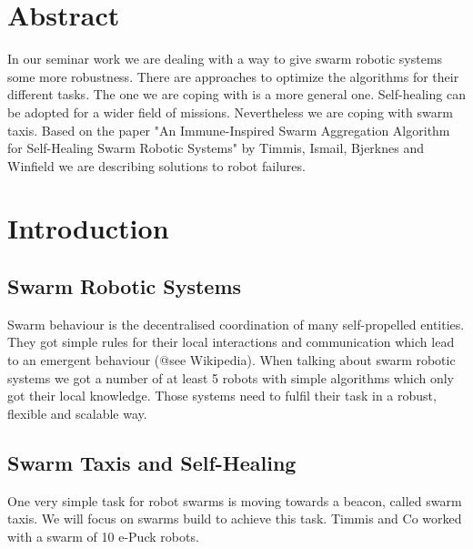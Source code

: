 \documentclass[
	a4paper,
	article,
	pagesize,
	pdftex,
	12pt,
	english,
	fleqn,
	final,
	]{scrartcl}
\begin{document}

\makeTitel

\tableofcontents
\clearpage

\section{Abstract}
In our seminar work we are dealing with a way to give swarm robotic systems some more robustness. There are approaches to optimize the algorithms for their different tasks. The one we are coping with is a more general one. Self-healing can be adopted for a wider field of missions. Nevertheless we are coping with swarm taxis. Based on the paper "An Immune-Inspired Swarm Aggregation Algorithm for Self-Healing Swarm Robotic Systems" by Timmis, Ismail, Bjerknes and Winfield we are describing solutions to robot failures.

\section{Introduction}

\subsection{Swarm Robotic Systems}
Swarm behaviour is the decentralised coordination of many self-propelled entities. They got simple rules for their local interactions and communication which lead to an emergent behaviour (@see Wikipedia). 
When talking about swarm robotic systems we got a number of at least 5 robots with simple algorithms which only got their local knowledge.
Those systems need to fulfil their task in a robust, flexible and scalable way.

\subsection{Swarm Taxis and Self-Healing}
One very simple task for robot swarms is moving towards a beacon, called swarm taxis. We will focus on swarms build to achieve this task. Timmis and Co worked with a swarm of 10 e-Puck robots.
\end{document}
